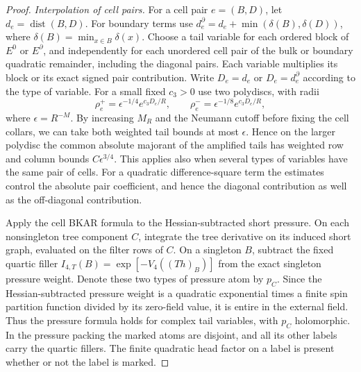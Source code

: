 \documentclass[11pt]{article}
\theoremstyle{definition}
\newcommand{\dist}{\operatorname{dist}}
\begin{document}
\begin{proof}
\emph{Interpolation of cell pairs.}
For a cell pair \(e=(B,D)\), let \(d_e=\dist(B,D)\). For
boundary terms use \(d_e^\partial=d_e+
\min(\delta(B),\delta(D))\), where \(\delta(B)=\min_{x\in B}\delta(x)\).
Choose a tail variable for each ordered block of \(E^0\) or
\(E^\partial\), and independently for each unordered cell pair
of the bulk or boundary quadratic remainder, including the
diagonal pairs. Each variable multiplies its block or its exact
signed pair contribution. Write \(D_e=d_e\) or
\(D_e=d_e^\partial\) according to the type of variable. For a
small fixed \(c_3>0\) use two polydiscs, with radii
\begin{equation}
 \rho_e^+=\epsilon^{-1/4}e^{c_3D_e/R},
 \qquad
 \rho_e^-=\epsilon^{-1/8}e^{c_3D_e/R},
\end{equation}
where \(\epsilon=R^{-M}\). By increasing \(M_R\) and the
Neumann cutoff before fixing the cell collars, we can take both
weighted tail bounds at most \(\epsilon\). Hence on the larger
polydisc the common absolute majorant of the amplified tails has
weighted row and column bounds \(C\epsilon^{3/4}\). This applies
also when several types of variables have the same pair of cells.
For a quadratic difference-square term the estimates control the
absolute pair coefficient, and hence the diagonal contribution
as well as the off-diagonal contribution.

Apply the cell BKAR formula to the Hessian-subtracted short
pressure. On each nonsingleton tree component \(C\), integrate
the tree derivative on its induced short graph, evaluated on
the filter rows of \(C\). On a singleton \(B\), subtract the
fixed quartic filler \(I_{4,T}(B)=\exp[-V_4((Th)_B)]\)
from the exact singleton pressure weight. Denote these two
types of pressure atom by \(p_C\). Since the Hessian-subtracted
pressure weight is a quadratic exponential times a finite spin
partition function divided by its zero-field value, it is entire
in the external field. Thus the pressure formula holds for
complex tail variables, with \(p_C\) holomorphic. In the
pressure packing the marked atoms are disjoint, and all its other
labels carry the quartic fillers. The finite quadratic head
factor on a label is present whether or not the label is marked.


\end{proof}
\end{document}
